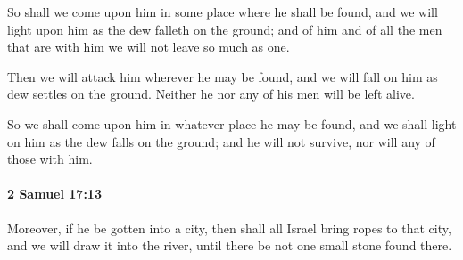 			\begin{versebox}
					\item[BHS] 
					\item[ASV] So shall we come upon him in some place where he shall be found, and we will light upon him as the dew falleth on the ground; and of him and of all the men that are with him we will not leave so much as one.
					\item[NIV] Then we will attack him wherever he may be found, and we will fall on him as dew settles on the ground. Neither he nor any of his men will be left alive.
					\item[NRSV] So we shall come upon him in whatever place he may be found, and we shall light on him as the dew falls on the ground; and he will not survive, nor will any of those with him.
			\end{versebox}

		\paragraph{2 Samuel 17:13} %
			\label{2SAMUEL-17-13}

			Moreover, if he be gotten into a city, then shall all Israel bring ropes to that city, and we will draw it into the river, until there be not one small stone found there.

